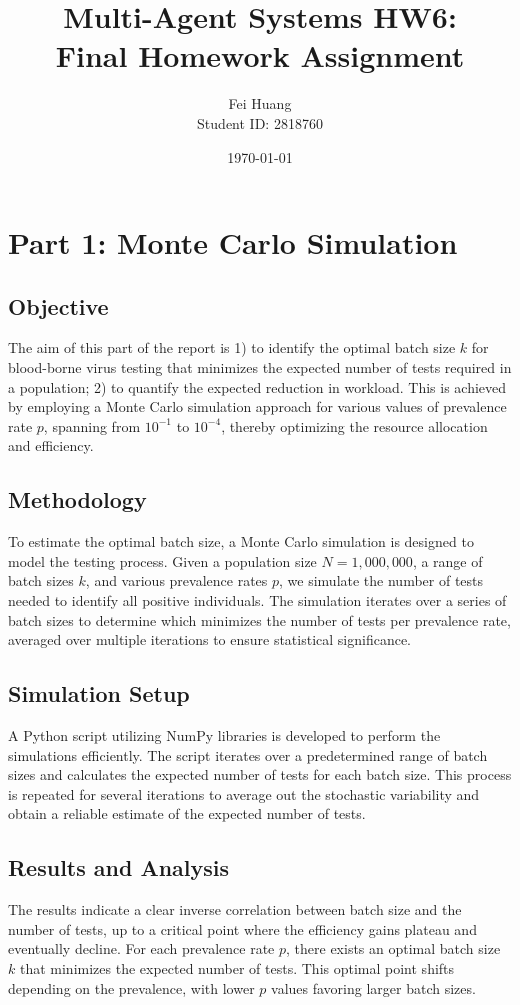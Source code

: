 \documentclass[12pt]{article}
\title{Multi-Agent Systems HW6:\\Final Homework Assignment}
\author{Fei Huang \\ Student ID: 2818760}
\date{\today}
\begin{document}
\maketitle

\section*{Part 1: Monte Carlo Simulation}

\subsection*{Objective}
The aim of this part of the report is 1) to identify the optimal batch size \( k \) for blood-borne virus testing that minimizes the expected number of tests required in a population; 2) to quantify the expected reduction in workload. This is achieved by employing a Monte Carlo simulation approach for various values of prevalence rate \( p \), spanning from \( 10^{-1} \) to \( 10^{-4} \), thereby optimizing the resource allocation and efficiency.

\subsection*{Methodology}
To estimate the optimal batch size, a Monte Carlo simulation is designed to model the testing process. Given a population size \( N = 1,000,000 \), a range of batch sizes \( k \), and various prevalence rates \( p \), we simulate the number of tests needed to identify all positive individuals. The simulation iterates over a series of batch sizes to determine which minimizes the number of tests per prevalence rate, averaged over multiple iterations to ensure statistical significance.

\subsection*{Simulation Setup}
A Python script utilizing NumPy libraries is developed to perform the simulations efficiently. The script iterates over a predetermined range of batch sizes and calculates the expected number of tests for each batch size. This process is repeated for several iterations to average out the stochastic variability and obtain a reliable estimate of the expected number of tests.

\subsection*{Results and Analysis}
The results indicate a clear inverse correlation between batch size and the number of tests, up to a critical point where the efficiency gains plateau and eventually decline. For each prevalence rate \( p \), there exists an optimal batch size \( k \) that minimizes the expected number of tests. This optimal point shifts depending on the prevalence, with lower \( p \) values favoring larger batch sizes.
\end{document}
